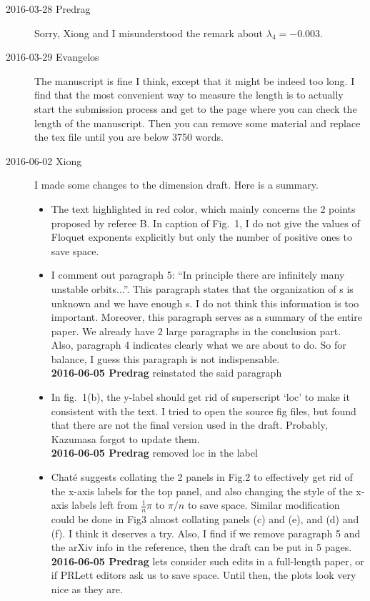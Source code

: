 \begin{description}
\item[2016-03-28 Predrag]
Sorry, Xiong and I misunderstood the remark about $\lambda_4= -0.003$.

\item[2016-03-29 Evangelos]
The manuscript is fine I think, except that it might be indeed too long.
I find that the most convenient way to measure the length is to actually
start the submission process and get to the page where you can check
the length of the manuscript. Then you can remove some material and
replace the tex file until you are below 3750 words.


\item[2016-06-02 Xiong]
I made some changes to the dimension draft. Here is a summary.
\begin{itemize}

\item The text highlighted in red color, which mainly concerns the 2 points
  proposed by referee B.
  In caption of Fig.~1, I do not give the values of Floquet
  exponents explicitly but only the number of positive ones to save space.

\item  I comment out paragraph 5:
  ``In principle there are infinitely many unstable orbits...''.
  This paragraph states that the organization of \po s is
  unknown and we have enough \po s. I do not think this
  information is too important. Moreover, this paragraph
  serves as a summary of the entire paper. We
  already have 2 large paragraphs in the conclusion part.
  Also, paragraph 4 indicates
  clearly what we are about to do. So for balance, I guess
  this paragraph is not indispensable.
  \\
  {\bf 2016-06-05 Predrag} reinstated the said paragraph

\item In fig.~1(b), the y-label should get rid of superscript `loc' to
make it consistent with the text. I tried to open the source fig files,
but found that there are not the final version used in the draft.
Probably, Kazumasa forgot to update them.
  \\
  {\bf 2016-06-05 Predrag} removed loc in the label

\item Chat\'e suggests collating the 2 panels in Fig.2 to
  effectively get rid of the x-axis labels for the top panel,
  and also changing the style of the x-axis labels left
  from $\frac{1}{n}\pi$ to $\pi/n$ to save space.
  Similar modification could be done in Fig3 almost
  collating panels (c) and (e), and (d) and (f).
  I think it deserves a try. Also, I find if we remove
  paragraph 5 and the arXiv info in the reference, then
  the draft can be put in 5 pages.
  \\
  {\bf 2016-06-05 Predrag} lets consider such edits in a full-length
  paper, or if PRLett editors ask us to save space. Until then, the plots
  look very nice as they are.


\end{itemize}
\end{description}
